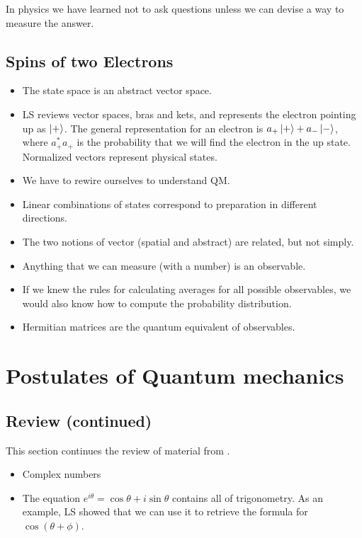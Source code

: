 \documentclass[]{article}
\begin{document}
In physics we have learned not to ask questions unless we can devise a way to measure the answer.


\subsection{Spins of two Electrons}

\begin{itemize}
	\item The state space is an abstract vector space.

	\item LS reviews vector spaces, bras and kets, and represents the electron pointing up as $\ket{+}$. The general representation for an electron is $a_+\ket{+}+a_-\ket{-}$, where $a_+^*a_+$ is the probability that we will find the electron in the up state. Normalized vectors represent physical states.
	
	\item We have to rewire ourselves to understand QM.

	\item Linear combinations of states correspond to preparation in different directions.
	
	\item The two notions of vector (spatial and abstract) are related, but not simply.
	
	\item Anything that we can measure (with a number) is an observable.
	
	\item If we knew the rules for calculating averages for all possible observables, we would also know how to compute the probability distribution.
	
	\item Hermitian matrices are the quantum equivalent of observables.
	
\end{itemize}


\section{Postulates of Quantum mechanics}
\subsection{Review (continued)}
This section continues the review of material from \cite{susskind2013quantum}.

\begin{itemize}
	\item Complex numbers
	\item The equation $e^{i\theta} = \cos{\theta} + i \sin{\theta}$ contains all of trigonometry. As an example, LS showed that we can use it to retrieve the formula for $\cos(\theta+\phi)$.
\end{itemize}
\end{document}
